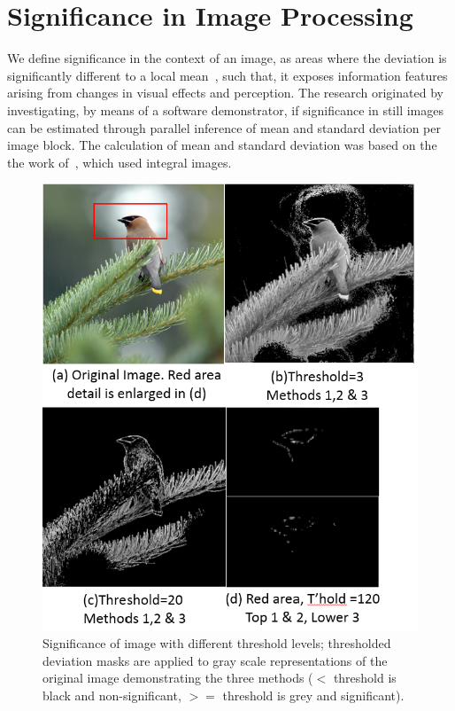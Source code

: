 \documentclass[journal]{IEEEtran}
\begin{document}
\section{Significance in Image Processing}
We define significance in the context of an image, as areas where the deviation is significantly different to a local mean~\cite{Godtliebsen2004}, such that, it exposes information features arising from changes in visual effects and perception. The research originated by investigating, by means of a software demonstrator, if significance in still images can be estimated through parallel inference of mean and standard deviation per image block. The calculation of mean and standard deviation was based on the the work of~\cite{Viola2004}, which used integral images.
\begin{figure}[htbp]
  \centering
  \includegraphics[width=\columnwidth]{CedarWaxThresholds2.png}
   \caption{Significance of image with different threshold levels; thresholded deviation masks are applied to gray scale representations of the original image demonstrating the three methods ($<$ threshold is black and non-significant, $>=$ threshold is grey and significant).}
  \label{fig:CedarWaxMask}
\end{figure}
\end{document}
